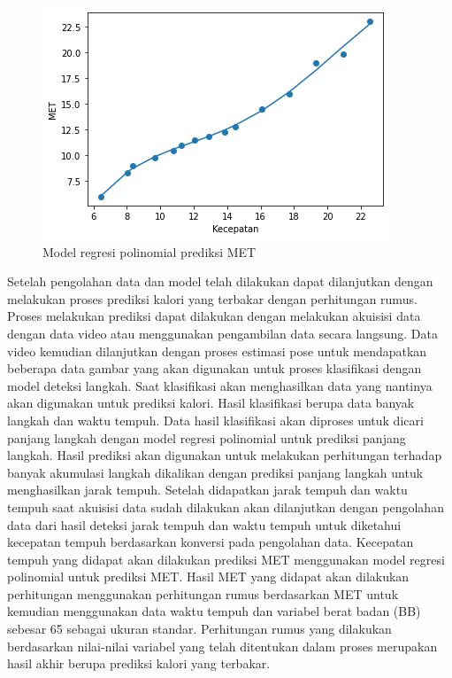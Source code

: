 \begin{figure}[H]
  \centering
  \includegraphics[scale=0.8]{gambar/model regresi poli met.png}
  \caption{Model regresi polinomial prediksi MET}
  \label{fig:ModelRegresiMET}
\end{figure}

Setelah pengolahan data dan model telah dilakukan dapat dilanjutkan dengan melakukan proses prediksi kalori yang terbakar dengan perhitungan rumus. Proses melakukan prediksi dapat dilakukan dengan melakukan akuisisi data dengan data video atau menggunakan pengambilan data secara langsung. Data video kemudian dilanjutkan dengan proses estimasi pose untuk mendapatkan beberapa data gambar yang akan digunakan untuk proses klasifikasi dengan model deteksi langkah. Saat klasifikasi akan menghasilkan data yang nantinya akan digunakan untuk prediksi kalori. Hasil klasifikasi berupa data banyak langkah dan waktu tempuh. Data hasil klasifikasi akan diproses untuk dicari panjang langkah dengan model regresi polinomial untuk prediksi panjang langkah. Hasil prediksi akan digunakan untuk melakukan perhitungan terhadap banyak akumulasi langkah dikalikan dengan prediksi panjang langkah untuk menghasilkan jarak tempuh. Setelah didapatkan jarak tempuh dan waktu tempuh saat akuisisi data sudah dilakukan akan dilanjutkan dengan pengolahan data dari hasil deteksi jarak tempuh dan waktu tempuh untuk diketahui kecepatan tempuh berdasarkan konversi pada pengolahan data. Kecepatan tempuh yang didapat akan dilakukan prediksi MET menggunakan model regresi polinomial untuk prediksi MET. Hasil MET yang didapat akan dilakukan perhitungan menggunakan perhitungan rumus berdasarkan MET untuk kemudian menggunakan data waktu tempuh dan variabel berat badan (BB) sebesar 65 sebagai ukuran standar. Perhitungan rumus yang dilakukan berdasarkan nilai-nilai variabel yang telah ditentukan dalam proses merupakan hasil akhir berupa prediksi kalori yang terbakar.
